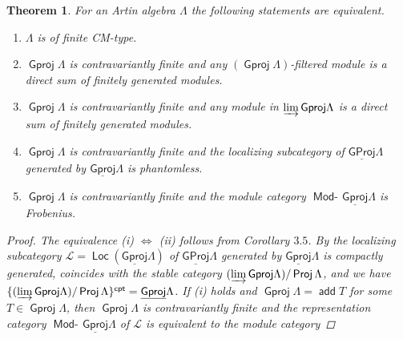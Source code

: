 \documentclass[oneside, a4paper,reqno]{amsart}
\numberwithin{equation}{section}
\newtheorem{thm}{Theorem}[section]
\theoremstyle{definition}
\begin{document}
\begin{thm} For an Artin algebra $\Lambda$ the following statements
are equivalent.
\begin{enumerate}
\item $\Lambda$ is of finite CM-type.
\item ${\operatorname{\mathsf{Gproj}}\nolimits}\Lambda$ is contravariantly finite and any
$({\operatorname{\mathsf{Gproj}}\nolimits}\Lambda)$-filtered module is a direct sum of finitely
generated modules.
\item ${\operatorname{\mathsf{Gproj}}\nolimits}\Lambda$ is contravariantly finite and any module in $\operatorname*{\varinjlim}{\operatorname{\mathsf{Gproj}}\nolimits}\Lambda$ is a direct sum of
finitely generated modules.
\item ${\operatorname{\mathsf{Gproj}}\nolimits}\Lambda$ is contravariantly finite and the localizing subcategory of ${\operatorname{\underline{\mathsf{GProj}}}\nolimits}\Lambda$ generated by
${\operatorname{\underline{\mathsf{Gproj}}}\nolimits}\Lambda$ is phantomless.
\item ${\operatorname{\mathsf{Gproj}}\nolimits}\Lambda$ is contravariantly finite and the module category $\operatorname*{\mathsf{Mod}-\!}{\operatorname{\underline{\mathsf{Gproj}}}\nolimits}\Lambda$ is Frobenius.
\end{enumerate}
\begin{proof} The equivalence (i) $\Leftrightarrow$ (ii) follows
from Corollary $3.5$. By \cite[Theorem 9.4]{B:cm} the localizing
subcategory $\mathcal L = \operatorname*{\mathsf{Loc}}({\operatorname{\underline{\mathsf{Gproj}}}\nolimits}\Lambda)$ of ${\operatorname{\underline{\mathsf{GProj}}}\nolimits}\Lambda$
generated by ${\operatorname{\underline{\mathsf{Gproj}}}\nolimits}\Lambda$ is compactly generated,  coincides
with the stable category $(\operatorname*{\varinjlim}{\operatorname{\mathsf{Gproj}}\nolimits}\Lambda)/\operatorname*{\mathsf{Proj}}\Lambda$,  and
we have $\{(\operatorname*{\varinjlim}{\operatorname{\mathsf{Gproj}}\nolimits}\Lambda)/\operatorname*{\mathsf{Proj}}\Lambda\}^{\mathsf{cpt}} =
{\operatorname{\underline{\mathsf{Gproj}}}\nolimits}\Lambda$. If (i) holds and ${\operatorname{\mathsf{Gproj}}\nolimits}\Lambda = \operatorname*{\mathsf{add}} T$ for some
$T \in {\operatorname{\mathsf{Gproj}}\nolimits}\Lambda$, then ${\operatorname{\mathsf{Gproj}}\nolimits}\Lambda$ is contravariantly
finite and the representation category $\operatorname*{\mathsf{Mod}-\!}{\operatorname{\underline{\mathsf{Gproj}}}\nolimits}\Lambda$ of
$\mathcal L$ is equivalent to the module category

\end{proof}
\end{thm}
\end{document}
